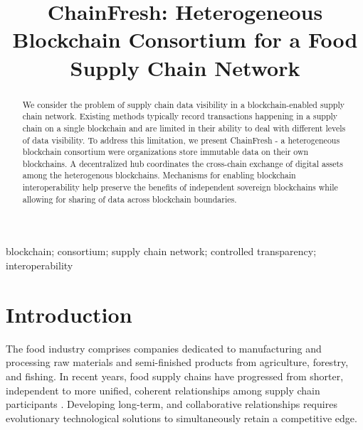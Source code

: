 \documentclass[conference]{IEEEtran}
\begin{document}
\title{ChainFresh: Heterogeneous Blockchain Consortium for a Food Supply Chain Network}

\author{
\and
{}
}

\maketitle

\begin{abstract}
We consider the problem of supply chain data visibility in a blockchain-enabled supply chain network. Existing methods typically record transactions happening in a supply chain on a single blockchain and are limited in their ability to deal with different levels of data visibility.
To address this limitation, we present ChainFresh - a heterogeneous blockchain consortium were organizations store immutable data on their own blockchains. A decentralized hub coordinates the cross-chain exchange of digital assets among the heterogenous blockchains.  
Mechanisms for enabling blockchain interoperability help preserve the benefits of independent sovereign blockchains while allowing for sharing of data across blockchain boundaries.
\end{abstract}

\begin{IEEEkeywords}
blockchain; consortium; supply chain network; controlled transparency; interoperability
\end{IEEEkeywords}

\section{Introduction} \label{s:introduction}
The food industry comprises companies dedicated to manufacturing and processing raw materials and semi-finished products from agriculture, forestry, and fishing. In recent years, food supply chains have progressed from shorter, independent to more unified, coherent relationships among supply chain participants \cite{bourlakis2008food}. Developing long-term, and collaborative relationships requires evolutionary technological solutions to simultaneously retain a competitive edge. 
\end{document}
